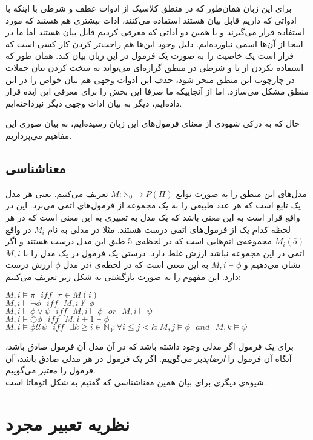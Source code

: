 برای این زبان همان‌طور که در منطق کلاسیک از ادوات عطف و شرطی با اینکه با ادواتی که داریم قابل بیان هستند استفاده می‌کنند، ادات بیشتری هم هستند که مورد استفاده قرار می‌گیرند و با همین دو اداتی که معرفی کردیم قابل بیان هستند اما ما در اینجا از آن‌ها اسمی نیاورده‌ایم. دلیل وجود این‌ها هم راحت‌تر کردن کار کسی است که قرار است یک خاصیت را به صورت یک فرمول در این زبان بیان کند. همان طور که استفاده نکردن از یا و شرطی در منطق گزاره‌ای می‌تواند به سخت کردن بیان جملات در چارچوب این منطق منجر شود، حذف این ادوات وجهی هم بیان خواص را در این منطق مشکل می‌سازد. اما از آنجاییکه ما صرفا این بخش را برای معرفی این ایده قرار داده‌ایم، دیگر به بیان ادات وجهی دیگر نپرداخته‌ایم.

حال که به درکی شهودی از معنای فرمول‌های این زبان رسیده‌ایم، به بیان صوری این مفاهیم می‌پردازیم.

\subsection{معناشناسی }

مدل‌های این منطق را به صورت توابع
$M:\mathbb{N}_0 \rightarrow \mathit{P}(\Pi)$ 
تعریف می‌کنیم. یعنی هر مدل یک تابع است که هر عدد طبیعی را به یک مجموعه از فرمول‌های اتمی می‌برد. این در واقع قرار است به این معنی باشد که یک مدل به تعبیری به این معنی است که در هر لحظه کدام یک از فرمول‌های اتمی درست هستند. مثلا در مدلی به نام $M_i$ در واقع
$M_i(5)$
مجموعه‌ی اتم‌هایی است که در لحظه‌ی 5 طبق این مدل درست هستند و اگر اتمی در این مجموعه نباشد ارزش غلط دارد.
درستی یک فرمول در یک مدل را با 
$M,i$
نشان می‌دهیم و 
$M,i \models \phi$
به این معنی است که در لحظه‌ی $i$در مدل $\phi$ ارزش درست دارد. این مفهوم را به صورت بازگشتی به شکل زیر تعریف می‌کنیم:


\begin{flushleft}
$	M,i \models \pi \:\:\: \mathit{iff} \:\:\: \pi \in M(i)$\\
$	M,i \models \neg \phi \:\:\: \mathit{iff} \:\:\: M,i\nvDash \phi$\\
$	M,i \models \phi \lor \psi \:\:\: \mathit{iff} \:\:\: M,i \models \phi \:\:\: \mathit{or} \:\:\: M,i \models \psi$\\
	 $M,i \models \bigcirc \phi  \:\:\:  \mathit{iff} \:\:\: M,i+1 \models \phi$\\
	 $M,i \models \phi \mathcal{U} \psi \:\:\: \mathit{iff} \:\:\: 
	 \exists k \geq i \in \mathbb{N}_0: \forall i\leq j< k: M,j \models \phi \:\:\: \mathit{and} \:\:\: M,k \models \psi$
\end{flushleft}

برای یک فرمول اگر مدلی وجود داشته باشد که در آن مدل آن فرمول صادق باشد، آنگاه آن فرمول را \emph{ارضاپذیر} می‌گوییم. اگر یک فرمول در هر مدلی صادق باشد، آن فرمول را \emph{معتبر} می‌گوییم.\\
شیوه‌ی دیگری برای بیان همین معناشناسی که گفتیم به شکل اتوماتا است. 


\section{نظریه تعبیر مجرد}


